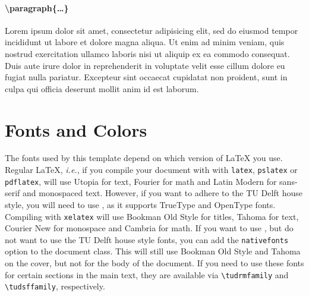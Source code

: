 \paragraph{\textbackslash paragraph\{\ldots\}}
Lorem ipsum dolor sit amet, consectetur adipisicing elit, sed do eiusmod tempor incididunt ut labore et dolore magna aliqua. Ut enim ad minim veniam, quis nostrud exercitation ullamco laboris nisi ut aliquip ex ea commodo consequat. Duis aute irure dolor in reprehenderit in voluptate velit esse cillum dolore eu fugiat nulla pariatur. Excepteur sint occaecat cupidatat non proident, sunt in culpa qui officia deserunt mollit anim id est laborum.

\section{Fonts and Colors}

The fonts used by this template depend on which version of \LaTeX{} you use. Regular \LaTeX, \emph{i.e.}, if you compile your document with with \texttt{latex}, \texttt{pslatex} or \texttt{pdflatex}, will use Utopia for text, Fourier for math and Latin Modern for sans-serif and monospaced text. However, if you want to adhere to the TU Delft house style, you will need to use \XeLaTeX, as it supports TrueType and OpenType fonts. Compiling with \texttt{xelatex} will use Bookman Old Style for titles, Tahoma for text, Courier New for monospace and Cambria for math. If you want to use \XeLaTeX, but do not want to use the TU Delft house style fonts, you can add the \texttt{nativefonts} option to the document class. This will still use Bookman Old Style and Tahoma on the cover, but not for the body of the document. If you need to use these fonts for certain sections in the main text, they are available via \texttt{\textbackslash tudrmfamily} and \texttt{\textbackslash tudsffamily}, respectively.

